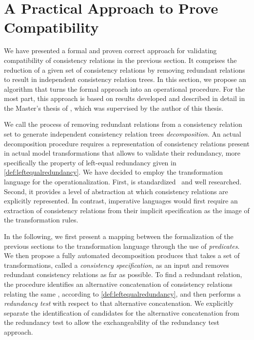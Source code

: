 \section{A Practical Approach to Prove Compatibility}
\label{chap:compatibility:practical_approach}

We have presented a formal and proven correct approach for validating compatibility of consistency relations in the previous section.
It comprises the reduction of a given set of consistency relations by removing redundant relations to result in independent consistency relation trees.
In this section, we propose an algorithm that turns the formal approach into an operational procedure.
For the most part, this approach is based on results developed and described in detail in the Master's thesis of \textcite{pepin2019ma}, which was supervised by the author of this thesis.

We call the process of removing redundant relations from a consistency relation set to generate independent consistency relation trees \emph{decomposition}.
An actual decomposition procedure requires a representation of consistency relations present in actual model transformations that allows to validate their redundancy, more specifically the property of left-equal redundancy given in \autoref{def:leftequalredundancy}.
We have decided to employ the transformation language \qvtr for the operationalization.
First, \qvtr is standardized~\cite{qvt} and well researched.
Second, it provides a level of abstraction at which consistency relations are explicitly represented.
In contrast, imperative languages would first require an extraction of consistency relations from their implicit specification as the image of the transformation rules.

In the following, we first present a mapping between the formalization of the previous sections to the \qvtr transformation language through the use of \emph{predicates}.
We then propose a fully automated decomposition produces that takes a set of \qvtr transformations, called a \emph{consistency specification}, as an input and removes redundant consistency relations as far as possible.
To find a redundant relation, the procedure identifies an alternative concatenation of consistency relations relating the same \metaclasses, according to \autoref{def:leftequalredundancy}, and then performs a \emph{redundancy test} with respect to that alternative concatenation.
We explicitly separate the identification of candidates for the alternative concatenation from the redundancy test to allow the exchangeability of the redundancy test approach.

